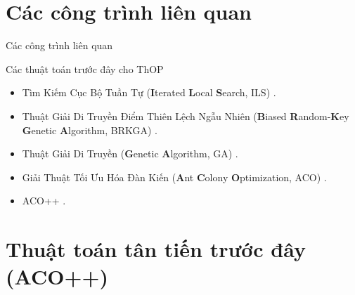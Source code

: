 \documentclass[aspectratio=169]{beamer}
\begin{document}
\section{Các công trình liên quan}
\begin{frame}{Các công trình liên quan}
    \begin{block}{Các thuật toán trước đây cho ThOP}
        \small
        \begin{itemize}
            \item Tìm Kiếm Cục Bộ Tuần Tự (\textbf{I}terated \textbf{L}ocal \textbf{S}earch, ILS) \footnotemark[1].
            \item Thuật Giải Di Truyền Điểm Thiên Lệch Ngẫu Nhiên (\textbf{B}iased \textbf{R}andom-\textbf{K}ey \textbf{G}enetic \textbf{A}lgorithm, BRKGA) \footnotemark[1].
            \item Thuật Giải Di Truyền (\textbf{G}enetic \textbf{A}lgorithm, GA) \footnotemark.
            \item Giải Thuật Tối Ưu Hóa Đàn Kiến (\textbf{A}nt \textbf{C}olony \textbf{O}ptimization, ACO) \footnotemark.
            \item ACO++ \footnotemark.
        \end{itemize}
    \end{block}
\end{frame}


\section{Thuật toán tân tiến trước đây (ACO++)}
\end{document}
